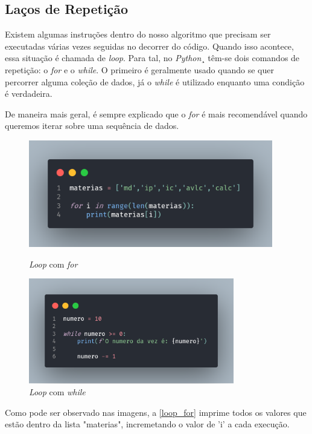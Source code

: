 \documentclass[a4paper, 12pt]{article} %
\begin{document}
\subsection{Laços de Repetição}
Existem algumas instruções dentro do nosso algoritmo  que precisam ser executadas várias vezes seguidas no decorrer do código. Quando isso acontece, essa situação é chamada de \textit{loop}. Para tal, no \textit{Python}¸ têm-se dois comandos de repetição: o \textit{for} e o \textit{while}. O primeiro é geralmente usado quando se quer percorrer alguma coleção de dados, já o \textit{while} é utilizado enquanto uma condição é verdadeira. 

De maneira mais geral, é sempre explicado que o \textit{for} é mais recomendável quando queremos iterar sobre uma sequência de dados. \cite{loops} 


\begin{figure}[ht]
    \centering
    \begin{minipage}{0.5\textwidth}
        \centering
        \includegraphics[width=0.95\textwidth]{imagens/loop_for.png} 
        \caption{\textit{Loop} com \textit{for}}
        \label{loop_for}
    \end{minipage}\hfill
    \begin{minipage}{0.5\textwidth}
        \centering
        \includegraphics[width=0.8\textwidth]{imagens/loop_while.png}
        \caption{\textit{Loop} com \textit{while}}
        \label{loop_while}
    \end{minipage}
\end{figure}
Como pode ser observado nas imagens, a \ref{loop_for} imprime todos os valores que estão dentro da lista "materias", incremetando o valor de 'i' a cada execução.
\end{document}
